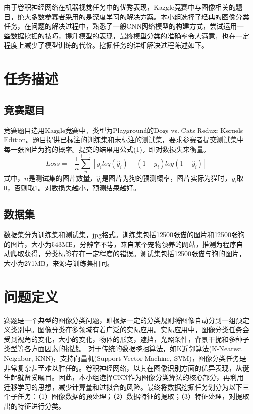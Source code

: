 \documentclass[10.5pt,twocolumn]{jbuaa}
\begin{document}
\wuhao


由于卷积神经网络在机器视觉任务中的优秀表现，Kaggle竞赛中与图像相关的题目，绝大多数参赛者采用的是深度学习的解决方案。本小组选择了经典的图像分类任务，在问题的解决过程中，熟悉了一般CNN网络模型的构建方式，尝试运用一些数据挖掘的技巧，提升模型的表现，最终模型分类的准确率令人满意，也在一定程度上减少了模型训练的代价。挖掘任务的详细解决过程陈述如下。

\section{任务描述}
\subsection{竞赛题目}
竞赛题目选用Kaggle竞赛中，类型为Playground的Dogs vs. Cats Redux: Kernels Edition。题目提供已标注的训练集和未标注的测试集，要求参赛者提交测试集中每一张图片为狗的概率。提交的结果用公式(1)，即对数损失来衡量。
\enlargethispage{-3.3cm}
\begin{equation}
\label{eqnLabel}
Loss=-\frac 1 n\sum_{n}^{i=1}[y_ilog(\hat y_i)+(1-y_i)log(1-\hat y_i)]
\end{equation}
式中，$n$是测试集的图片数量，$\hat y_i$是图片为狗的预测概率，图片实际为猫时，$y_i$取0，否则取1。对数损失越小，预测结果越好。
\subsection{数据集}
数据集分为训练集和测试集，jpg格式。训练集包括12500张猫的图片和12500张狗的图片，大小为543MB，分辨率不等，来自某个宠物领养的网站，推测为程序自动爬取获得，分类标签存在一定程度的错误。测试集包括12500张猫与狗的图片，大小为271MB，来源与训练集相同。

\section{问题定义}
赛题是一个典型的图像分类问题，即根据一定的分类规则将图像自动分到一组预定义类别中。图像分类在多领域有着广泛的实际应用。实际应用中，图像分类任务会受到视角的变化，大小的变化，物体的形变，遮挡，光照条件，背景干扰和多种子类型等各方面因素的挑战。
\enlargethispage{-3.3cm}
对于传统的数据挖掘算法，如K近邻算法(K-Nearest Neighbor, KNN)，支持向量机(Support Vector Machine, SVM)，图像分类任务是非常复杂甚至难以胜任的。卷积神经网络，以其在图像识别方面的优异表现，从诞生起就备受瞩目。因此，本小组选择CNN作为图像分类算法的核心部分，再利用迁移学习的思想，减少计算量和过拟合的风险。最终将数据挖掘任务划分为以下三个子任务：（1）图像数据的预处理；（2）数据特征的提取；（3）特征处理，对提取出的特征进行分类。
\end{document}
